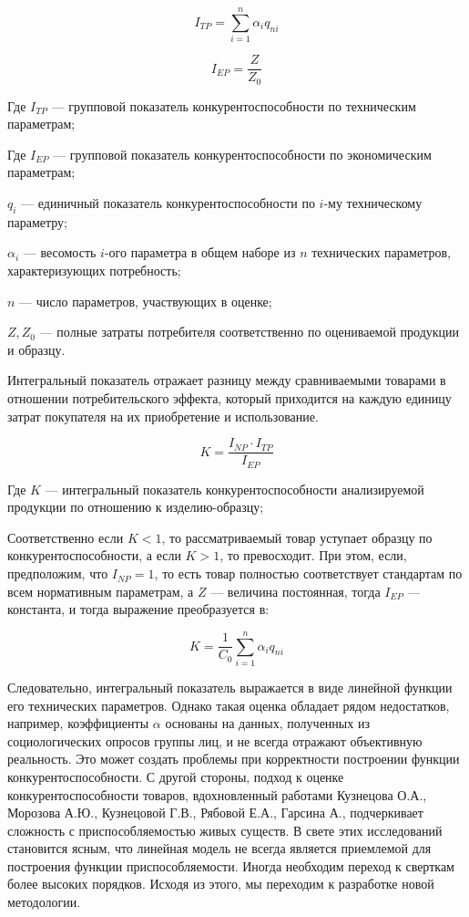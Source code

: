 \documentclass[14pt, a4paper]{extarticle}
\begin{document}
  \[
  I_{TP} = \sum_{i=1}^n \alpha_i q_{ni}
  \]
  
  \[
  I_{EP} = \frac{Z}{Z_0}
  \]
  
  Где \(I_{TP}\) — групповой показатель конкурентоспособности по техническим параметрам;
  
  Где \(I_{EP}\) — групповой показатель конкурентоспособности по экономическим параметрам;
  
  \(q_{i}\) — единичный показатель конкурентоспособности по \(i\)-му техническому параметру;
  
  \(\alpha_i\) — весомость \(i\)-ого параметра в общем наборе из \(n\) технических параметров, характеризующих потребность;
  
  \(n\) — число параметров, участвующих в оценке;
  
  \(Z, Z_0\) — полные затраты потребителя соответственно по оцениваемой продукции и образцу.
  
  Интегральный показатель отражает разницу между сравниваемыми товарами в отношении потребительского эффекта, который приходится на каждую единицу затрат покупателя на их приобретение и использование.

  \[
  K = \frac{I_{NP} \cdot I_{TP}}{I_{EP}}
  \]
  
  Где \(K\) — интегральный показатель конкурентоспособности анализируемой продукции по отношению к изделию-образцу;
  
  Соответственно если \(K < 1\), то рассматриваемый товар уступает образцу по конкурентоспособности, а если \(K > 1\), то превосходит. При этом, если, предположим, что \(I_{NP} = 1\), то есть товар полностью соответствует стандартам по всем нормативным параметрам, а \(Z\) — величина постоянная, тогда \(I_{EP}\) — константа, и тогда выражение преобразуется в:
  
  \[
  K = \frac{1}{C_0} \sum_{i=1}^n \alpha_i q_{ni}
  \]
  
  Следовательно, интегральный показатель выражается в виде линейной функции его технических параметров. Однако такая оценка обладает рядом недостатков, например, коэффициенты \(\alpha\) основаны на данных, полученных из социологических опросов группы лиц, и не всегда отражают объективную реальность. Это может создать проблемы при корректности построении функции конкурентоспособности. С другой стороны, подход к оценке конкурентоспособности товаров, вдохновленный работами Кузнецова О.А., Морозова А.Ю., Кузнецовой Г.В., Рябовой Е.А., Гарсина А., подчеркивает сложность с приспособляемостью живых существ. В свете этих исследований становится ясным, что линейная модель не всегда является приемлемой для построения функции приспособляемости. Иногда необходим переход к сверткам более высоких порядков. Исходя из этого, мы переходим к разработке новой методологии.
  
\end{document}

